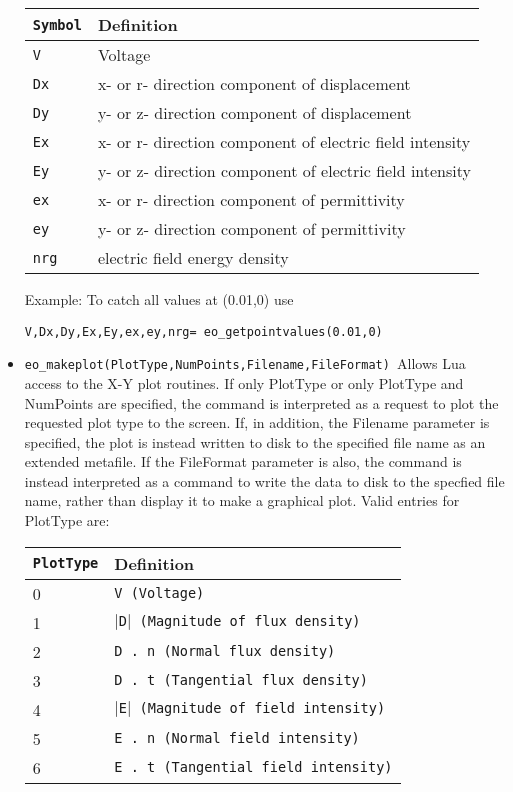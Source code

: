 \begin{itemize}
\begin{tabular}{ll}
\texttt{Symbol} &  Definition \\ \hline
\texttt{V} & Voltage \\
\texttt{Dx} & x- or r- direction component of displacement \\
\texttt{Dy} & y- or z- direction component of displacement \\
\texttt{Ex} & x- or r- direction component of electric field intensity \\
\texttt{Ey} & y- or z- direction component of electric field intensity \\
\texttt{ex} & x- or r- direction component of permittivity \\
\texttt{ey} & y- or z- direction component of permittivity \\
\texttt{nrg} & electric field energy density \\
\end{tabular}

Example: To catch all values at (0.01,0) use

\texttt{V,Dx,Dy,Ex,Ey,ex,ey,nrg= eo\_getpointvalues(0.01,0) }

\item \texttt{eo\_makeplot(PlotType,NumPoints,Filename,FileFormat) }Allows Lua access
to the X-Y plot routines. If only PlotType or only PlotType and NumPoints
are specified, the command is interpreted as a request to plot the requested
plot type to the screen. If, in addition, the Filename parameter is
specified, the plot is instead written to disk to the specified file name as
an extended metafile. If the FileFormat parameter is also, the command is
instead interpreted as a command to write the data to disk to the specfied
file name, rather than display it to make a graphical plot. Valid entries
for PlotType are:

\begin{tabular}{ll}
\texttt{PlotType} &  Definition \\ \hline
 0 & \texttt{V (Voltage)} \\
 1 & \texttt{$\vert$D$\vert$ (Magnitude of flux density)} \\
 2 & \texttt{D . n (Normal flux density)} \\
 3 & \texttt{D . t (Tangential flux density)} \\
 4 & \texttt{$\vert$E$\vert$ (Magnitude of field intensity)} \\
 5 & \texttt{E . n (Normal field intensity)} \\
 6 & \texttt{E . t (Tangential field intensity)}
\end{tabular}


\end{itemize}
